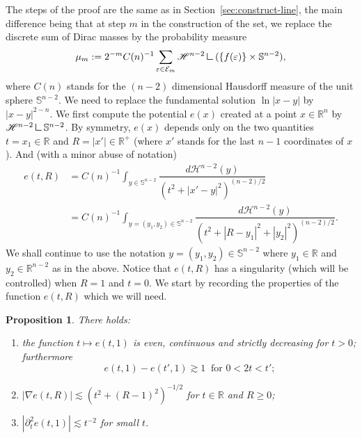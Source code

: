 \documentclass[10pt]{amsart}
\newenvironment{enumeratei}
{\bgroup\def\theenumi{\roman{enumi}}\def\theenumii{\arabic{enumii}}\begin{enumerate}}
{\end{enumerate}\egroup}
\numberwithin{equation}{section}
\theoremstyle{plain}
\newtheorem{pro}[lem]{Proposition}
\theoremstyle{definition}
\newcommand{\R}{\mathbb{R}}
\newcommand{\cE}{{\mathcal E}}
\newcommand{\mres}{\mathbin{\vrule height 1.6ex depth 0pt width
0.13ex\vrule height 0.13ex depth 0pt width 1.3ex}}
\begin{document}
The steps of the proof are the same as in Section~\ref{sec:construct-line}, the main difference being that at step $m$ in the construction of the set, we replace the discrete sum of Dirac masses by the probability measure\vspace*{-3pt}
\[
\mu_m:= 2^{-m}C(n)^{-1}\sum_{\varepsilon \in \cE_m} \mathscr{H}^{n-2}\mres (\{f(\varepsilon)\}\times \mathbb{S}^{n-2}),
\]
where $C(n)$ stands for the $(n-2)$ dimensional Hausdorff measure of the unit sphere $\mathbb{S}^{n-2}$.
We need to replace the fundamental solution $\ln|x -y|$ by $|x-y|^{2-n}$.
We first compute the potential $e(x)$ created at a point $x\in \R^n$ by $\mathscr{H}^{n-2}\mres \mathbb{S}^{n-2}$.
By symmetry, $e(x)$ depends only on the two quantities $t = x_1 \in \R$ and $R = |x'| \in \R^+$ (where $x'$ stands for
the last $n-1$ coordinates of $x$). And (with a minor abuse of notation)
\begin{equation*}
\begin{aligned}
e(t,R) &= C(n)^{-1} \int_{y\in \mathbb{S}^{n-2}} \dfrac{d \mathscr{H}^{n-2}(y)}{(t^2+ |x'-y|^2)^{(n-2)/2}}
\\ &= C(n)^{-1} \int_{y=(y_1,y_2)\in \mathbb{S}^{n-2}} \dfrac{d \mathscr{H}^{n-2}(y)}{(t^2+ |R-y_1|^2 +|y_2|^2)^{(n-2)/2}}.
\end{aligned}
\end{equation*}
We shall continue to use the notation $y = (y_1, y_2) \in \mathbb{S}^{n-2}$ where $y_1 \in \R$ and $y_2 \in \R^{n-2}$
as in the above.
Notice that $e(t,R)$ has a singularity (which will be controlled) when $R=1$ and $t=0$.
We start by recording the properties of the function $e(t,R)$ which we will need.
\begin{pro}\label{pro:fundsol} There holds:
\begin{enumeratei}
\item the function $t\mapsto e(t,1)$ is even, continuous and strictly decreasing for $t>0$;
furthermore\vspace*{-3pt}
\label{e-continuous}
\[
e(t, 1)-e(t',1) \gtrsim 1 \ \text{ for $0<2t<t'$;}
\]
\item $|\nabla e(t,R)| \lesssim (t^2 + (R-1)^2)^{-1/2}$ for $t \in \R$ and $R \geq 0$;
\label{e-derivative}
\item $|\partial^2_te(t,1)| \lesssim t^{-2}$ for small $t$.\label{e-secondderivative}
\end{enumeratei}
\end{pro}
\end{document}
